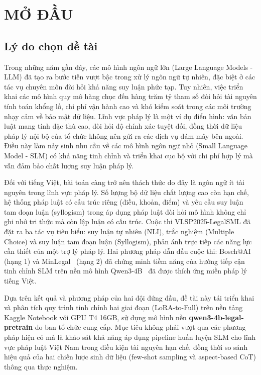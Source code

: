 \chapter*{MỞ ĐẦU}

\section*{Lý do chọn đề tài}

Trong những năm gần đây, các mô hình ngôn ngữ lớn (Large Language Models - LLM) đã tạo ra bước tiến vượt bậc trong xử lý ngôn ngữ tự nhiên, đặc biệt ở các tác vụ chuyên môn đòi hỏi khả năng suy luận phức tạp. Tuy nhiên, việc triển khai các mô hình quy mô hàng chục đến hàng trăm tỷ tham số đòi hỏi tài nguyên tính toán khổng lồ, chi phí vận hành cao và khó kiểm soát trong các môi trường nhạy cảm về bảo mật dữ liệu. Lĩnh vực pháp lý là một ví dụ điển hình: văn bản luật mang tính đặc thù cao, đòi hỏi độ chính xác tuyệt đối, đồng thời dữ liệu pháp lý nội bộ của tổ chức không nên gửi ra các dịch vụ đám mây bên ngoài. Điều này làm nảy sinh nhu cầu về các mô hình ngôn ngữ nhỏ (Small Language Model - SLM) có khả năng tinh chỉnh và triển khai cục bộ với chi phí hợp lý mà vẫn đảm bảo chất lượng suy luận pháp lý.

Đối với tiếng Việt, bài toán càng trở nên thách thức do đây là ngôn ngữ ít tài nguyên trong lĩnh vực pháp lý. Số lượng bộ dữ liệu chất lượng cao còn hạn chế, hệ thống pháp luật có cấu trúc riêng (điều, khoản, điểm) và yêu cầu suy luận tam đoạn luận (syllogism) trong áp dụng pháp luật đòi hỏi mô hình không chỉ ghi nhớ tri thức mà còn lập luận có cấu trúc. Cuộc thi VLSP2025-LegalSML đã đặt ra ba tác vụ tiêu biểu: suy luận tự nhiên (NLI), trắc nghiệm (Multiple Choice) và suy luận tam đoạn luận (Syllogism), phản ánh trực tiếp các năng lực cần thiết của một trợ lý pháp lý. Hai phương pháp dẫn đầu cuộc thi: Bosch@AI~\cite{quang2025bosch} (hạng 1) và MinLegal~\cite{luan2025minlegal} (hạng 2) đã chứng minh tiềm năng của hướng tiếp cận tinh chỉnh SLM trên nền mô hình Qwen3-4B~\cite{yang2025qwen3} đã được thích ứng miền pháp lý tiếng Việt.

 Dựa trên kết quả và phương pháp của hai đội đứng đầu, đề tài này tái triển khai và phân tích quy trình tinh chỉnh hai giai đoạn (LoRA-to-Full) trên nền tảng Kaggle Notebook với GPU T4 16GB, sử dụng mô hình nền \textbf{qwen3-4b-legal-pretrain} do ban tổ chức cung cấp. Mục tiêu không phải vượt qua các phương pháp hiện có mà là khảo sát khả năng áp dụng pipeline huấn luyện SLM cho lĩnh vực pháp luật Việt Nam trong điều kiện tài nguyên hạn chế, đồng thời so sánh hiệu quả của hai chiến lược sinh dữ liệu (few-shot sampling và aspect-based CoT) thông qua thực nghiệm.


